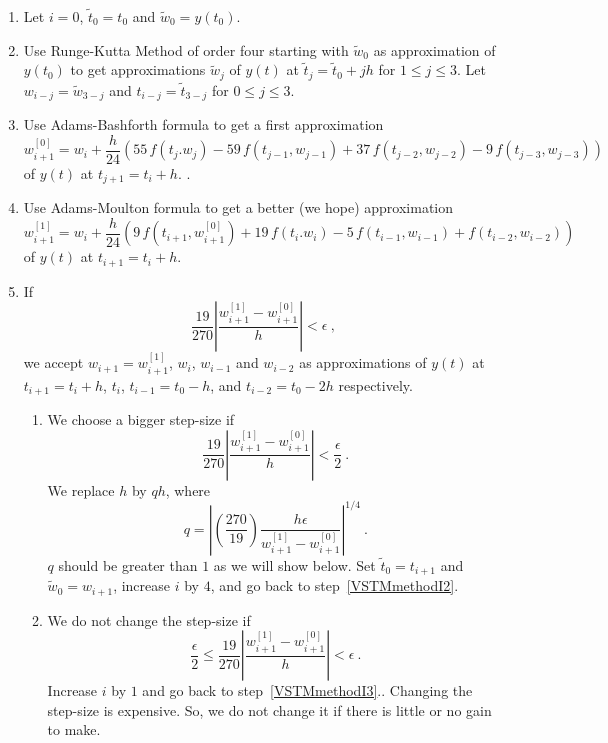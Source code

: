 \begin{algo}
\begin{enumerate}
\item Let $i=0$, $\tilde{t}_0 = t_0$ and $\tilde{w}_0 = y(t_0)$.
\item Use Runge-Kutta Method of order four starting with $\tilde{w}_0$
as approximation of $y(t_0)$ to get approximations $\tilde{w}_j$
of $y(t)$ at $\tilde{t}_j = \tilde{t}_0 + jh$ for $1 \leq j \leq 3$.
Let $w_{i-j} = \tilde{w}_{3-j}$ and $t_{i-j} = \tilde{t}_{3-j}$ for
$0 \leq j \leq 3$. \label{VSTMmethodI2}
\item Use Adams-Bashforth formula to get a first approximation
\[
w_{i+1}^{[0]} = w_i + \frac{h}{24} \left( 55 \, f(t_j.w_j)
- 59 \, f(t_{j-1},w_{j-1}) + 37\, f(t_{j-2},w_{j-2})
- 9 \,f(t_{j-3},w_{j-3}) \right)
\]
of $y(t)$ at $t_{j+1}=t_i+h$.  \label{VSTMmethodI3}.
\item Use Adams-Moulton formula to get a better (we hope)
approximation
\[
w_{i+1}^{[1]} = w_i + \frac{h}{24} \left( 9\, f\left(t_{i+1},w_{i+1}^{[0]}\right)
+ 19 \, f(t_i.w_i)  - 5 \,f(t_{i-1},w_{i-1}) + f(t_{i-2},w_{i-2})\right)
\]
of $y(t)$ at $t_{i+1}=t_i+h$.
\item If
\[
\frac{19}{270} \left| \frac{w_{i+1}^{[1]} - w_{i+1}^{[0]}}{h} \right|
< \epsilon \  ,
\]
we accept $\displaystyle w_{i+1} = w_{i+1}^{[1]}$, $w_i$, $w_{i-1}$
and $w_{i-2}$ as approximations of $y(t)$ at $t_{i+1}=t_i+h$, $t_i$,
$t_{i-1} = t_0- h$, and $t_{i-2}=t_0-2h$ respectively.
\begin{enumerate}
\item  We choose a bigger step-size if
\[
\frac{19}{270} \left| \frac{w_{i+1}^{[1]} - w_{i+1}^{[0]}}{h} \right| <
\frac{\epsilon}{2} \ .
\]
We replace $h$ by $qh$, where
\begin{equation}\label{Q}
q= \left| \left(\frac{270}{19}\right)
\frac{h\epsilon}{w_{i+1}^{[1]} - w_{i+1}^{[0]}} \right|^{1/4} \ .
\end{equation}
$q$ should be greater than $1$ as we will show below.
Set $\tilde{t}_0 = t_{i+1}$ and $\tilde{w}_0 = w_{i+1}$, increase $i$
by $4$, and go back to step~\ref{VSTMmethodI2}.
\item We do not change the step-size if
\[
\frac{\epsilon}{2} \leq \frac{19}{270} \left|
\frac{w_{i+1}^{[1]} - w_{i+1}^{[0]}}{h}
\right| < \epsilon \  .
\]
Increase $i$ by $1$ and go back to step~\ref{VSTMmethodI3}..
Changing the step-size is expensive.  So, we do not change it if there
is little or no gain to make.
\end{enumerate}

\end{enumerate}
\end{algo}
